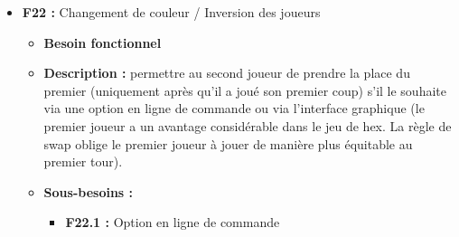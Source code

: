 \documentclass{article}
\begin{document}
\begin{itemize}
\begin{itemize}
\begin{itemize}
\begin{itemize}
                \item \textbf{Prérequis :} Fichier de configuration (\textbf{F41}) pour la durée par défaut si temps non spécifié (\textbf{F21}).
                \item \textbf{Tests :} il faudra tester les fonctions et variables de ce module sur une exécution du programme afin de vérifier que le temps s’écoule comme souhaité.
            \end{itemize}
            \smallskip
            \item \textbf{F20.3 :} Temps écoulé
            \begin{itemize}
                \item \textbf{Description :} en mode blitz, si le temps d’un joueur est écoulé, il perd automatiquement.
                \item \textbf{Actions :} le module blitztimer (\textbf{20.2}) doit évaluer si un joueur atteint son temps max chaque fois que le timer est mis à jour (via une boucle if), auquel cas la partie doit se finir est le joueur n’ayant plus de temps est perdant.
                \item \textbf{Prérequis :} Module blitztimer (\textbf{20.2}), fin de partie (\textbf{F37.1}).
                \item \textbf{Tests :} le jeu pourra être lancé avec un temps extrêmement faible afin de vérifier que la partie se termine automatiquement avec le premier joueur perdant.
            \end{itemize}
        \end{itemize}
    \end{itemize}
\bigskip
    \item \textbf{F22 :} Changement de couleur / Inversion  des joueurs
    \begin{itemize}
        \item \textbf{Besoin fonctionnel}
        \item \textbf{Description :} permettre au second joueur de prendre la place du premier (uniquement après qu’il a joué son premier coup) s’il le souhaite via une option en ligne de commande ou via l’interface graphique (le premier joueur a un avantage considérable dans le jeu de hex. La règle de swap oblige le premier joueur à jouer de manière plus équitable au premier tour).
        \item \textbf{Sous-besoins :}
        \begin{itemize}
            \smallskip
            \item \textbf{F22.1 :} Option en ligne de commande

\end{itemize}
\end{itemize}
\end{itemize}
\end{document}
